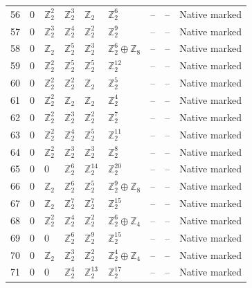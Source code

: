 \documentclass[10pt]{article}
\begin{document}
\begin{longtable}{r|lllll|rrl}
56 & $0$ & $\mathbb{Z}_{2}^{2}$ & $\mathbb{Z}_{2}^{3}$ & $\mathbb{Z}_{2}$ & $\mathbb{Z}_{2}^{6}$ & -- & -- & Native marked\\
57 & $0$ & $\mathbb{Z}_{2}^{3}$ & $\mathbb{Z}_{2}^{4}$ & $\mathbb{Z}_{2}^{2}$ & $\mathbb{Z}_{2}^{9}$ & -- & -- & Native marked\\
58 & $0$ & $\mathbb{Z}_{2}$ & $\mathbb{Z}_{2}^{5}$ & $\mathbb{Z}_{2}^{3}$ & $\mathbb{Z}_{2}^{6}\oplus \mathbb{Z}_{8}$ & -- & -- & Native marked\\
59 & $0$ & $\mathbb{Z}_{2}^{2}$ & $\mathbb{Z}_{2}^{5}$ & $\mathbb{Z}_{2}^{5}$ & $\mathbb{Z}_{2}^{12}$ & -- & -- & Native marked\\
60 & $0$ & $\mathbb{Z}_{2}^{2}$ & $\mathbb{Z}_{2}^{2}$ & $\mathbb{Z}_{2}$ & $\mathbb{Z}_{2}^{5}$ & -- & -- & Native marked\\
61 & $0$ & $\mathbb{Z}_{2}^{2}$ & $\mathbb{Z}_{2}$ & $\mathbb{Z}_{2}$ & $\mathbb{Z}_{2}^{4}$ & -- & -- & Native marked\\
62 & $0$ & $\mathbb{Z}_{2}^{2}$ & $\mathbb{Z}_{2}^{3}$ & $\mathbb{Z}_{2}^{2}$ & $\mathbb{Z}_{2}^{7}$ & -- & -- & Native marked\\
63 & $0$ & $\mathbb{Z}_{2}^{2}$ & $\mathbb{Z}_{2}^{4}$ & $\mathbb{Z}_{2}^{5}$ & $\mathbb{Z}_{2}^{11}$ & -- & -- & Native marked\\
64 & $0$ & $\mathbb{Z}_{2}^{2}$ & $\mathbb{Z}_{2}^{3}$ & $\mathbb{Z}_{2}^{3}$ & $\mathbb{Z}_{2}^{8}$ & -- & -- & Native marked\\
65 & $0$ & $0$ & $\mathbb{Z}_{2}^{6}$ & $\mathbb{Z}_{2}^{14}$ & $\mathbb{Z}_{2}^{20}$ & -- & -- & Native marked\\
66 & $0$ & $\mathbb{Z}_{2}$ & $\mathbb{Z}_{2}^{6}$ & $\mathbb{Z}_{2}^{5}$ & $\mathbb{Z}_{2}^{9}\oplus \mathbb{Z}_{8}$ & -- & -- & Native marked\\
67 & $0$ & $\mathbb{Z}_{2}$ & $\mathbb{Z}_{2}^{7}$ & $\mathbb{Z}_{2}^{7}$ & $\mathbb{Z}_{2}^{15}$ & -- & -- & Native marked\\
68 & $0$ & $\mathbb{Z}_{2}^{2}$ & $\mathbb{Z}_{2}^{4}$ & $\mathbb{Z}_{2}^{2}$ & $\mathbb{Z}_{2}^{6}\oplus \mathbb{Z}_{4}$ & -- & -- & Native marked\\
69 & $0$ & $0$ & $\mathbb{Z}_{2}^{6}$ & $\mathbb{Z}_{2}^{9}$ & $\mathbb{Z}_{2}^{15}$ & -- & -- & Native marked\\
70 & $0$ & $\mathbb{Z}_{2}$ & $\mathbb{Z}_{2}^{3}$ & $\mathbb{Z}_{2}^{2}$ & $\mathbb{Z}_{2}^{4}\oplus \mathbb{Z}_{4}$ & -- & -- & Native marked\\
71 & $0$ & $0$ & $\mathbb{Z}_{2}^{4}$ & $\mathbb{Z}_{2}^{13}$ & $\mathbb{Z}_{2}^{17}$ & -- & -- & Native marked\\

\end{longtable}
\end{document}
